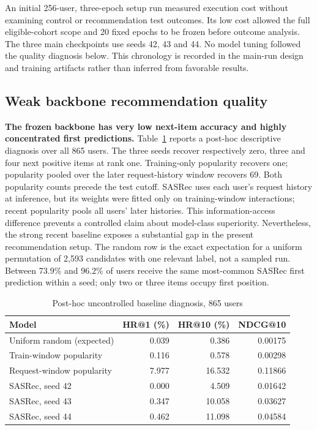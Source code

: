 \documentclass[conference]{IEEEtran}
\newcommand{\toprule}{\hline}
\newcommand{\midrule}{\hline}
\newcommand{\bottomrule}{\hline}
\begin{document}
An initial 256-user, three-epoch setup run measured execution cost without examining control or recommendation test outcomes. Its low cost allowed the full eligible-cohort scope and 20 fixed epochs to be frozen before outcome analysis. The three main checkpoints use seeds 42, 43 and 44. No model tuning followed the quality diagnosis below. This chronology is recorded in the main-run design and training artifacts rather than inferred from favorable results.

\subsection{Weak backbone recommendation quality}
\label{sec:weakbackbone}
\textbf{The frozen backbone has very low next-item accuracy and highly concentrated first predictions.} Table~\ref{tab:basequality} reports a post-hoc descriptive diagnosis over all 865 users. The three seeds recover respectively zero, three and four next positive items at rank one. Training-only popularity recovers one; popularity pooled over the later request-history window recovers 69. Both popularity counts precede the test cutoff. SASRec uses each user's request history at inference, but its weights were fitted only on training-window interactions; recent popularity pools all users' later histories. This information-access difference prevents a controlled claim about model-class superiority. Nevertheless, the strong recent baseline exposes a substantial gap in the present recommendation setup. The random row is the exact expectation for a uniform permutation of 2,593 candidates with one relevant label, not a sampled run. Between 73.9\% and 96.2\% of users receive the same most-common SASRec first prediction within a seed; only two or three items occupy first position.

\begin{table}[t]
\caption{Post-hoc uncontrolled baseline diagnosis, 865 users}
\label{tab:basequality}
\centering\small
\setlength{\tabcolsep}{3pt}
\begin{tabular}{@{}lrrr@{}}
\toprule
Model & HR@1 (\%) & HR@10 (\%) & NDCG@10\\\midrule
Uniform random (expected) & 0.039 & 0.386 & 0.00175\\
Train-window popularity & 0.116 & 0.578 & 0.00298\\
Request-window popularity & 7.977 & 16.532 & 0.11866\\
SASRec, seed 42 & 0.000 & 4.509 & 0.01642\\
SASRec, seed 43 & 0.347 & 10.058 & 0.03627\\
SASRec, seed 44 & 0.462 & 11.098 & 0.04584\\\bottomrule
\end{tabular}
\end{table}
\end{document}
